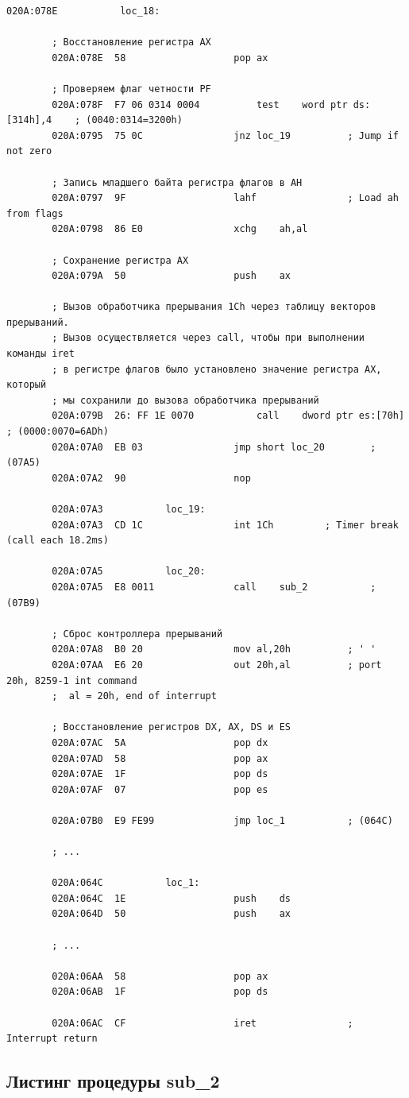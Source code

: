 \documentclass[14pt, a4paper]{article}
\begin{document}
\begin{lstlisting}[style={asm}]
		020A:078E			loc_18:
		
		; Восстановление регистра AX
		020A:078E  58					pop	ax
		
		; Проверяем флаг четности PF
		020A:078F  F7 06 0314 0004			test	word ptr ds:[314h],4	; (0040:0314=3200h)
		020A:0795  75 0C				jnz	loc_19			; Jump if not zero
		
		; Запись младшего байта регистра флагов в AH
		020A:0797  9F					lahf				; Load ah from flags
		020A:0798  86 E0				xchg	ah,al
		
		; Сохранение регистра AX
		020A:079A  50					push	ax
		
		; Вызов обработчика прерывания 1Ch через таблицу векторов прерываний.
		; Вызов осуществляется через call, чтобы при выполнении команды iret
		; в регистре флагов было установлено значение регистра AX, который
		; мы сохранили до вызова обработчика прерываний
		020A:079B  26: FF 1E 0070			call	dword ptr es:[70h]	; (0000:0070=6ADh)
		020A:07A0  EB 03				jmp	short loc_20		; (07A5)
		020A:07A2  90					nop
		
		020A:07A3			loc_19:
		020A:07A3  CD 1C				int	1Ch			; Timer break (call each 18.2ms)
		
		020A:07A5			loc_20:
		020A:07A5  E8 0011				call	sub_2			; (07B9)
		
		; Сброс контроллера прерываний
		020A:07A8  B0 20				mov	al,20h			; ' '
		020A:07AA  E6 20				out	20h,al			; port 20h, 8259-1 int command
		;  al = 20h, end of interrupt
		
		; Восстановление регистров DX, AX, DS и ES
		020A:07AC  5A					pop	dx
		020A:07AD  58					pop	ax
		020A:07AE  1F					pop	ds
		020A:07AF  07					pop	es
		
		020A:07B0  E9 FE99				jmp	loc_1			; (064C)
		
		; ...
		
		020A:064C			loc_1:
		020A:064C  1E					push	ds
		020A:064D  50					push	ax
		
		; ...
		
		020A:06AA  58					pop	ax
		020A:06AB  1F					pop	ds
		
		020A:06AC  CF					iret				; Interrupt return
	\end{lstlisting}
	
	\subsection*{Листинг процедуры sub\_2}
	
\end{document}
